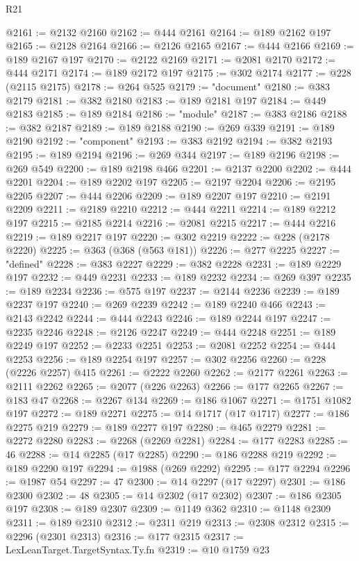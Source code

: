 \begin{lexlean}{R21}
\begin{coremodule}
@2161 := @2132 @2160
@2162 := @444 @2161
@2164 := @189 @2162 @197
@2165 := @2128 @2164
@2166 := @2126 @2165
@2167 := @444 @2166
@2169 := @189 @2167 @197
@2170 := @2122 @2169
@2171 := @2081 @2170
@2172 := @444 @2171
@2174 := @189 @2172 @197
@2175 := @302 @2174
@2177 := @228 (@2115 @2175)
@2178 := @264 @525
@2179 := "document"
@2180 := @383 @2179
@2181 := @382 @2180
@2183 := @189 @2181 @197
@2184 := @449 @2183
@2185 := @189 @2184
@2186 := "module"
@2187 := @383 @2186
@2188 := @382 @2187
@2189 := @189 @2188
@2190 := @269 @339
@2191 := @189 @2190
@2192 := "component"
@2193 := @383 @2192
@2194 := @382 @2193
@2195 := @189 @2194
@2196 := @269 @344
@2197 := @189 @2196
@2198 := @269 @549
@2200 := @189 @2198 @466
@2201 := @2137 @2200
@2202 := @444 @2201
@2204 := @189 @2202 @197
@2205 := @2197 @2204
@2206 := @2195 @2205
@2207 := @444 @2206
@2209 := @189 @2207 @197
@2210 := @2191 @2209
@2211 := @2189 @2210
@2212 := @444 @2211
@2214 := @189 @2212 @197
@2215 := @2185 @2214
@2216 := @2081 @2215
@2217 := @444 @2216
@2219 := @189 @2217 @197
@2220 := @302 @2219
@2222 := @228 (@2178 @2220)
@2225 := @363 (@368 (@563 @181))
@2226 := @277 @2225
@2227 := "defined"
@2228 := @383 @2227
@2229 := @382 @2228
@2231 := @189 @2229 @197
@2232 := @449 @2231
@2233 := @189 @2232
@2234 := @269 @397
@2235 := @189 @2234
@2236 := @575 @197
@2237 := @2144 @2236
@2239 := @189 @2237 @197
@2240 := @269 @2239
@2242 := @189 @2240 @466
@2243 := @2143 @2242
@2244 := @444 @2243
@2246 := @189 @2244 @197
@2247 := @2235 @2246
@2248 := @2126 @2247
@2249 := @444 @2248
@2251 := @189 @2249 @197
@2252 := @2233 @2251
@2253 := @2081 @2252
@2254 := @444 @2253
@2256 := @189 @2254 @197
@2257 := @302 @2256
@2260 := @228 (@2226 @2257) @415
@2261 := @2222 @2260
@2262 := @2177 @2261
@2263 := @2111 @2262
@2265 := @2077 (@226 @2263)
@2266 := @177 @2265
@2267 := @183 @47
@2268 := @2267 @134
@2269 := @186 @1067
@2271 := @1751 @1082 @197
@2272 := @189 @2271
@2275 := @14 @1717 (@17 @1717)
@2277 := @186 @2275 @219
@2279 := @189 @2277 @197
@2280 := @465 @2279
@2281 := @2272 @2280
@2283 := @2268 (@2269 @2281)
@2284 := @177 @2283
@2285 := 46
@2288 := @14 @2285 (@17 @2285)
@2290 := @186 @2288 @219
@2292 := @189 @2290 @197
@2294 := @1988 (@269 @2292)
@2295 := @177 @2294
@2296 := @1987 @54
@2297 := 47
@2300 := @14 @2297 (@17 @2297)
@2301 := @186 @2300
@2302 := 48
@2305 := @14 @2302 (@17 @2302)
@2307 := @186 @2305 @197
@2308 := @189 @2307
@2309 := @1149 @362
@2310 := @1148 @2309
@2311 := @189 @2310
@2312 := @2311 @219
@2313 := @2308 @2312
@2315 := @2296 (@2301 @2313)
@2316 := @177 @2315
@2317 := LexLeanTarget.TargetSyntax.Ty.fn
@2319 := @10 @1759 @23

\end{coremodule}
\end{lexlean}
